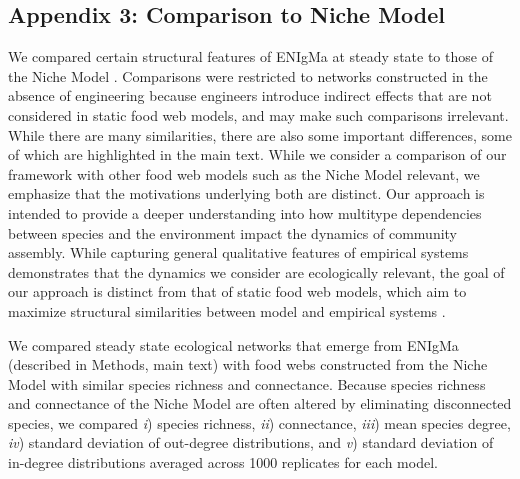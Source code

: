 \documentclass[twocolumn,preprintnumbers,amsmath,amssymb,superscriptaddress,linenumbers]{revtex4-1}
\begin{document}
\subsection*{Appendix 3: Comparison to Niche Model}
We compared certain structural features of ENIgMa at steady state to those of the Niche Model \cite{Williams2000}.
Comparisons were restricted to networks constructed in the absence of engineering because engineers introduce indirect effects that are not considered in static food web models, and may make such comparisons irrelevant.
While there are many similarities, there are also some important differences, some of which are highlighted in the main text.
While we consider a comparison of our framework with other food web models such as the Niche Model relevant, we emphasize that the motivations underlying both are distinct.
Our approach is intended to provide a deeper understanding into how multitype dependencies between species and the environment impact the dynamics of community assembly.
While capturing general qualitative features of empirical systems demonstrates that the dynamics we consider are ecologically relevant, the goal of our approach is distinct from that of static food web models, which aim to maximize structural similarities between model and empirical systems \cite{Williams2000,Williams2011}.

We compared steady state ecological networks that emerge from ENIgMa (described in Methods, main text) with food webs constructed from the Niche Model \cite{Williams2000} with similar species richness and connectance.
Because species richness and connectance of the Niche Model are often altered by eliminating disconnected species, we compared
\emph{i}) species richness,
\emph{ii}) connectance,
\emph{iii}) mean species degree,
\emph{iv}) standard deviation of out-degree distributions, and
\emph{v}) standard deviation of in-degree distributions
averaged across 1000 replicates for each model.
\end{document}
